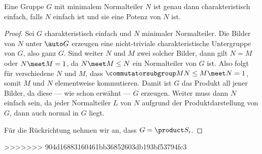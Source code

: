 \begin{theorem}
    Eine Gruppe $G$ mit minimalem Normalteiler $N$ ist genau dann charakteristisch einfach, falls $N$ einfach ist und sie eine Potenz von $N$ ist.
\end{theorem}

\begin{proof}
    Sei $G$ charakteristisch einfach und $N$ minimaler Normalteiler. Die Bilder von $N$ unter $\auto G$ erzeugen eine nicht-triviale
    charakteristische Untergruppe von $G$, also ganz $G$. Sind weiter $N$ und $M$ zwei solcher Bilder, dann gilt $N = M$ oder
    $N\meet M = 1$, da $N\meet M\leq N$ ein Normalteiler von $G$ ist. Also folgt für verschiedene $N$ und $M$, dass
    $\commutatorsubgroup M N \leq M\meet N = 1$, somit $M$ und $N$ elementweise kommutieren. Damit ist $G$ das Produkt all
    jener Bilder, da diese --- wie schon erwähnt --- $G$ erzeugen. Weiter muss dann $N$ einfach sein, da jeder Normalteiler $L$ von
    $N$ aufgrund der Produktdarstellung von $G$, dann auch normal in $G$ liegt.

    Für die Rückrichtung nehmen wir an, dass $G = \product S_i$.
\end{proof}


>>>>>>> 904d16883160461bb36852603db193bf53794fc3

